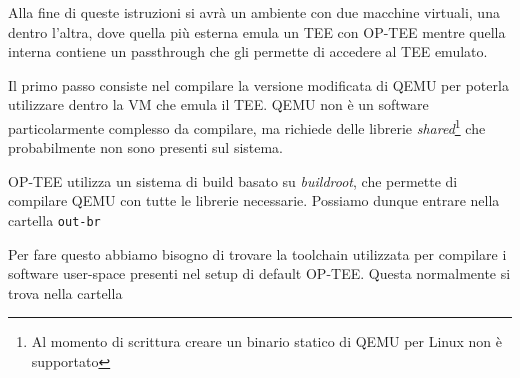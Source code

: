 \documentclass[12pt,italian]{report}
\begin{document}
Alla fine di queste istruzioni si avrà un ambiente con due macchine virtuali,
una dentro l'altra, dove quella più esterna emula un TEE con OP-TEE mentre
quella interna contiene un passthrough che gli permette di accedere al TEE
emulato.

Il primo passo consiste nel compilare la versione modificata di QEMU per
poterla utilizzare dentro la VM che emula il TEE.
QEMU non è un software particolarmente complesso da compilare, ma richiede
delle librerie \textit{shared}\footnote{
    Al momento di scrittura creare un binario statico di QEMU per Linux
    non è supportato
} che probabilmente non sono presenti sul sistema.

OP-TEE utilizza un sistema di build basato su \textit{buildroot}, che
permette di compilare QEMU con tutte le librerie necessarie.
Possiamo dunque entrare nella cartella \texttt{out-br}

Per fare questo abbiamo bisogno di trovare la toolchain utilizzata per
compilare i software user-space presenti nel setup di default OP-TEE.
Questa normalmente si trova nella cartella 
\end{document}
